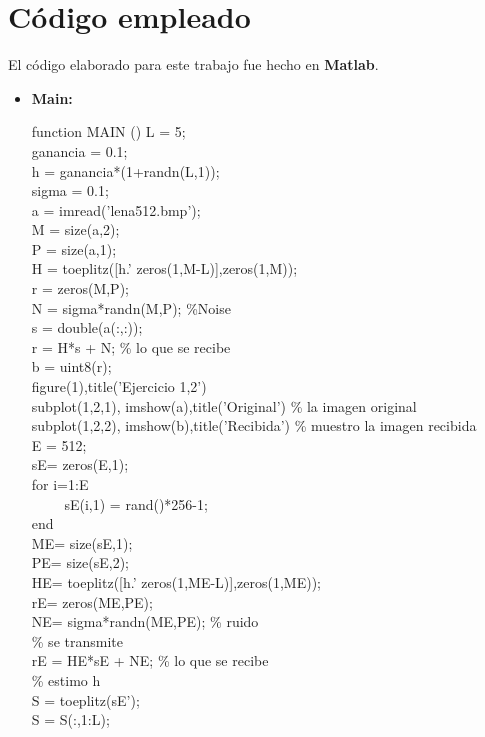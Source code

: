 \documentclass[a4paper]{article}
\begin{document}
\section{Código empleado}
	El código elaborado para este trabajo fue hecho en \textbf{Matlab}.\\
	\begin{itemize}
	\item \textbf{Main:}
		\begin{tabbing}
		function MAIN () L = 5;\\
		ganancia = 0.1;\\
		h = ganancia*(1+randn(L,1));\\
		sigma = 0.1;\\
		a = imread('lena512.bmp');\\
		M = size(a,2);\\
		P = size(a,1);\\
		H = toeplitz([h.' zeros(1,M-L)],zeros(1,M));\\
		r = zeros(M,P);\\
		N = sigma*randn(M,P); \%Noise\\
		s = double(a(:,:)); \\
		r = H*s + N; \% lo que se recibe\\
		b = uint8(r);\\
		figure(1),title('Ejercicio 1,2')\\
		subplot(1,2,1), imshow(a),title('Original') \% 	 la imagen original\\
		subplot(1,2,2), imshow(b),title('Recibida') \% muestro la imagen recibida\\
		E = 512;\\
		sE= zeros(E,1);\\
		for i=1:E\\
		~~~~ sE(i,1) = rand()*256-1;\\
		end\\
		ME= size(sE,1);\\
		PE= size(sE,2);\\
		HE= toeplitz([h.' zeros(1,ME-L)],zeros(1,ME));\\
		rE= zeros(ME,PE);\\
		NE= sigma*randn(ME,PE); \% ruido\\
		\% se transmite\\
		rE = HE*sE + NE; \% lo que se recibe\\
		\% estimo h\\
		S = toeplitz(sE');\\
		S = S(:,1:L);\\

\end{tabbing}
\end{itemize}
\end{document}
